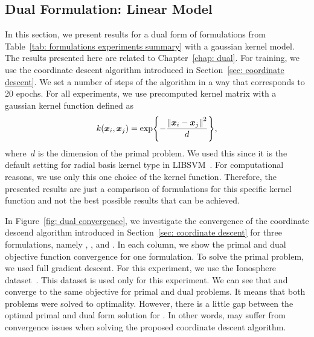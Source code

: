 \pagebreak

\subsection{Dual Formulation: Linear Model}\label{sec: results dual}

In this section, we present results for a dual form of formulations from Table~\ref{tab: formulations experiments summary} with a gaussian kernel model. The results presented here are related to Chapter~\ref{chap: dual}. For training, we use the coordinate descent algorithm introduced in Section~\ref{sec: coordinate descent}. We set a number of steps of the algorithm in a way that corresponds to 20 epochs. For all experiments, we use precomputed kernel matrix with a gaussian kernel function defined as 
\begin{equation*}
  k(\bm{x}_i, \bm{x}_j) = \exp\Brac[c]{- \frac{\norm{\bm{x}_i - \bm{x}_j}^2}{d}},
\end{equation*}
where~$d$ is the dimension of the primal problem. We used this since it is the default setting for radial basis kernel type in LIBSVM~\cite{chang2011libsvm}. For computational reasons, we use only this one choice of the kernel function. Therefore, the presented results are just a comparison of formulations for this specific kernel function and not the best possible results that can be achieved.

In Figure~\ref{fig: dual convergence}, we investigate the convergence of the coordinate descend algorithm introduced in Section~\ref{sec: coordinate descent} for three formulations, namely \TopPush, \TopPushK, and \PatMatNP. In each column, we show the primal and dual objective function convergence for one formulation. To solve the primal problem, we used full gradient descent. For this experiment, we use the Ionosphere dataset~\cite{sigillito1989classification}. This dataset is used only for this experiment. We can see that \TopPush and \TopPushK converge to the same objective for primal and dual problems. It means that both problems were solved to optimality. However, there is a little gap between the optimal primal and dual form solution for \PatMatNP. In other words, \PatMatNP may suffer from convergence issues when solving the proposed coordinate descent algorithm.  

